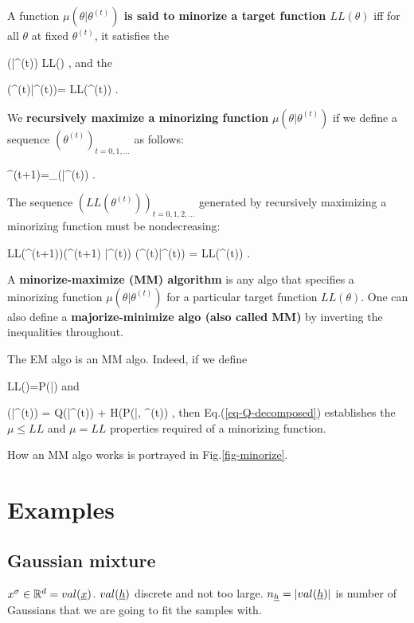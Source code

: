 A function {\bf $\mu(\theta|\theta^{(t)})$
is said to minorize
 a target
 function $ LL(\theta)$}
iff for all $ \theta$ at fixed
$\theta^{(t)}$,
it satisfies the


\beq
\mu(\theta|\theta^{(t)})\leq
 LL(\theta)
\;,
\eeq
and
the 

\beq
\mu(\theta^{(t)}|\theta^{(t)})=
 LL(\theta^{(t)})
\;.
\eeq

We  {\bf recursively maximize a minorizing function} $\mu(\theta|\theta^{(t)})$
if we define a sequence $(\theta^{(t)})_{t=0, 1, \ldots}$
as follows:

\beq
\theta^{(t+1)}=\argmax_\theta \mu(\theta|\theta^{(t)})
\;.
\eeq

The sequence
$( LL(\theta^{(t)}))_{t=0, 1, 2, \ldots}$
generated by
recursively maximizing a minorizing function
must be nondecreasing:

\beq
 LL(\theta^{(t+1)})\geq \mu(\theta^{(t+1)}
|\theta^{(t)})\geq
 \mu(\theta^{(t)}|\theta^{(t)})
=  LL(\theta^{(t)})
\;.
\eeq

A {\bf
minorize-maximize (MM) algorithm}
is any algo that
specifies a
minorizing function $\mu(\theta|\theta^{(t)})$
for a particular target
 function $ LL(\theta)$.
One can also define a
{\bf majorize-minimize algo (also
called  MM)}
by inverting the inequalities throughout.


The EM algo is an MM algo.
Indeed, if we define

\beq
 LL(\theta)=\ln P(\vecx|\theta)
\eeq
and

\beq
\mu(\theta|\theta^{(t)})
=
Q(\theta|\theta^{(t)})
+
H(P(\ul{\vech}|\vecx, \theta^{(t)})
\;,
\eeq
then Eq.(\ref{eq-Q-decomposed})
establishes
the $\mu\leq  LL$
and $\mu= LL$ properties
required of
a minorizing function.

How an MM algo works
is portrayed in Fig.\ref{fig-minorize}.


\section{Examples}

\subsection{Gaussian mixture}


$x^\s\in \RR^d=val(\rvx)$. $val(\rvh)$ discrete and
not too large. $n_\rvh=|val(\rvh)|$ is
number of Gaussians that we are
going to fit the samples with.

